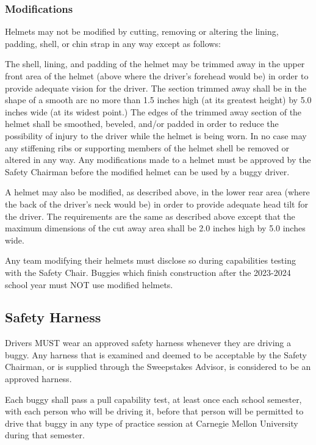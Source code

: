 \subsubsection{Modifications}

	Helmets may not be modified by cutting, removing or altering the lining, padding, shell, or chin strap in any way except as follows:
	\newline

	The shell, lining, and padding of the helmet may be trimmed away in the upper front area of the helmet (above where the driver's forehead would be) in order to provide adequate vision for the driver. The section trimmed away shall be in the shape of a smooth arc no more than 1.5 inches high (at its greatest height) by 5.0 inches wide (at its widest point.) The edges of the trimmed away section of the helmet shall be smoothed, beveled, and/or padded in order to reduce the possibility of injury to the driver while the helmet is being worn. In no case may any stiffening ribs or supporting members of the helmet shell be removed or altered in any way. Any modifications made to a helmet must be approved by the Safety Chairman before the modified helmet can be used by a buggy driver.
	
	A helmet may also be modified, as described above, in the lower rear area (where the back of the driver's neck would be) in order to provide adequate head tilt for the driver. The requirements are the same as described above except that the maximum dimensions of the cut away area shall be 2.0 inches high by 5.0 inches wide.

	Any team modifying their helmets must disclose so during capabilities testing with the Safety Chair. Buggies which finish construction after the 2023-2024 school year must NOT use modified helmets.

\subsection{Safety Harness}

	Drivers MUST wear an approved safety harness whenever they are driving a buggy. Any harness that is examined and deemed to be acceptable by the Safety Chairman, or is supplied through the Sweepstakes Advisor, is considered to be an approved harness. 

	Each buggy shall pass a pull capability test, at least once each school semester, with each person who will be driving it, before that person will be permitted to drive that buggy in any type of practice session at Carnegie Mellon University during that semester. 

